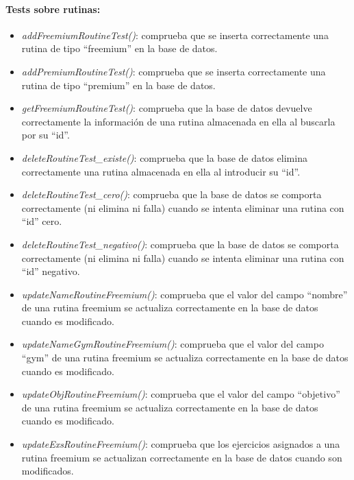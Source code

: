 \documentclass[11pt,a4paper]{report}
\begin{document}
\paragraph{Tests sobre rutinas:}
\begin{itemize}
	\item \textit{addFreemiumRoutineTest()}: comprueba que se inserta correctamente una rutina de tipo “freemium” en la base de datos.

	\item \textit{addPremiumRoutineTest()}: comprueba que se inserta correctamente una rutina de tipo “premium” en la base de datos.

	\item \textit{getFreemiumRoutineTest()}: comprueba que la base de datos devuelve correctamente la información de una rutina almacenada en ella al buscarla por su “id”.

	\item \textit{deleteRoutineTest\_existe()}: comprueba que la base de datos elimina correctamente una rutina almacenada en ella al introducir su “id”.

	\item \textit{deleteRoutineTest\_cero()}: comprueba que la base de datos se comporta correctamente (ni elimina ni falla) cuando se intenta eliminar una rutina con “id” cero.

	\item \textit{deleteRoutineTest\_negativo()}: comprueba que la base de datos se comporta correctamente (ni elimina ni falla) cuando se intenta eliminar una rutina con “id” negativo.

	\item \textit{updateNameRoutineFreemium()}: comprueba que el valor del campo “nombre” de una rutina freemium se actualiza correctamente en la base de datos cuando es modificado.

	\item \textit{updateNameGymRoutineFreemium()}: comprueba que el valor del campo “gym” de una rutina freemium se actualiza correctamente en la base de datos cuando es modificado.

	\item \textit{updateObjRoutineFreemium()}: comprueba que el valor del campo “objetivo” de una rutina freemium se actualiza correctamente en la base de datos cuando es modificado.

	\item \textit{updateExsRoutineFreemium()}: comprueba que los ejercicios asignados a una rutina freemium se actualizan correctamente en la base de datos cuando son modificados.


\end{itemize}
\end{document}

